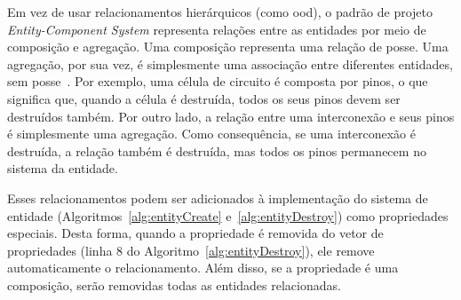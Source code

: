   Em vez de usar relacionamentos hierárquicos (como \ac{ood}), o padrão de projeto \textit{Entity-Component System} representa relações entre as entidades por meio de composição e agregação. Uma composição representa uma relação de posse. Uma agregação, por sua vez, é simplesmente uma associação entre diferentes entidades, sem posse~\cite{gamma1995design}.
  Por exemplo, uma célula de circuito é composta por pinos, o que significa que, quando a célula é destruída, todos os seus pinos devem ser destruídos também. Por outro lado, a relação entre uma interconexão e seus pinos é simplesmente uma agregação. Como consequência, se uma interconexão é destruída, a relação também é destruída, mas todos os pinos permanecem no sistema da entidade.

  Esses relacionamentos podem ser adicionados à implementação do sistema de entidade (Algoritmos~\ref{alg:entityCreate} e~\ref{alg:entityDestroy}) como propriedades especiais. Desta forma, quando a propriedade é removida do vetor de propriedades (linha $ 8 $ do Algoritmo~\ref{alg:entityDestroy}), ele remove automaticamente o relacionamento. Além disso, se a propriedade é uma composição, serão removidas todas as entidades relacionadas.


